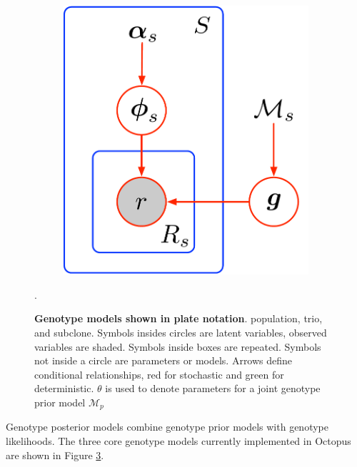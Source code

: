 \documentclass[notitlepage, twocolumn]{article}
\begin{document}
\begin{figure}[ht]
\begin{subfigure}[b]{0.3\textwidth}
        \caption{}
        \label{fig:trio}
    \end{subfigure}
    \hfill
    \begin{subfigure}[b]{0.3\textwidth}
        \includegraphics[width=\textwidth]{figures/subclone_model}
        \caption{}
        \label{fig:subclone}
    \end{subfigure}
    \caption{\textbf{Genotype models shown in plate notation}. \protect{} population, \protect{} trio, and \protect{} subclone. Symbols insides circles are latent variables, observed variables are shaded. Symbols inside boxes are repeated. Symbols not inside a circle are parameters or models. Arrows define conditional relationships, red for stochastic and green for deterministic. $\theta$ is used to denote parameters for a joint genotype prior model $\mathcal{M}_p$}.
    \label{fig:genotype-models}
\end{figure}

Genotype posterior models combine genotype prior models with genotype likelihoods. The three core genotype models currently implemented in Octopus are shown in Figure \ref{fig:genotype-models}.\\
\end{document}
